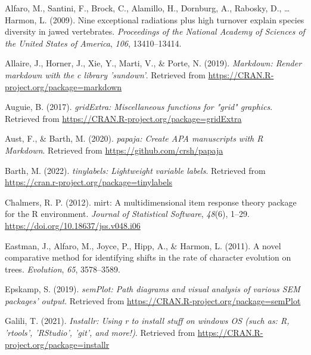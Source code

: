 \documentclass[
  english,
  man]{apa6}
\newlength{\cslhangindent}
\newlength{\cslentryspacingunit} %
\newenvironment{CSLReferences}[2] %
 {%
  \setlength{\parindent}{0pt}
  \ifodd #1
  \let\oldpar\par
  \def\par{\hangindent=\cslhangindent\oldpar}
  \fi
  \setlength{\parskip}{#2\cslentryspacingunit}
 }%
 {}
\begin{document}
\hypertarget{refs}{}
\begin{CSLReferences}{1}{0}
\leavevmode{}%
Alfaro, M., Santini, F., Brock, C., Alamillo, H., Dornburg, A., Rabosky, D., \ldots{} Harmon, L. (2009). Nine exceptional radiations plus high turnover explain species diversity in jawed vertebrates. \emph{Proceedings of the National Academy of Sciences of the United States of America}, \emph{106}, 13410--13414.

\leavevmode{}%
Allaire, J., Horner, J., Xie, Y., Marti, V., \& Porte, N. (2019). \emph{Markdown: Render markdown with the c library 'sundown'}. Retrieved from \url{https://CRAN.R-project.org/package=markdown}

\leavevmode{}%
Auguie, B. (2017). \emph{gridExtra: Miscellaneous functions for "grid" graphics}. Retrieved from \url{https://CRAN.R-project.org/package=gridExtra}

\leavevmode{}%
Aust, F., \& Barth, M. (2020). \emph{{papaja}: {Create} {APA} manuscripts with {R Markdown}}. Retrieved from \url{https://github.com/crsh/papaja}

\leavevmode{}%
Barth, M. (2022). \emph{{tinylabels}: Lightweight variable labels}. Retrieved from \url{https://cran.r-project.org/package=tinylabels}

\leavevmode{}%
Chalmers, R. P. (2012). {mirt}: A multidimensional item response theory package for the {R} environment. \emph{Journal of Statistical Software}, \emph{48}(6), 1--29. \url{https://doi.org/10.18637/jss.v048.i06}

\leavevmode{}%
Eastman, J., Alfaro, M., Joyce, P., Hipp, A., \& Harmon, L. (2011). A novel comparative method for identifying shifts in the rate of character evolution on trees. \emph{Evolution}, \emph{65}, 3578--3589.

\leavevmode{}%
Epskamp, S. (2019). \emph{semPlot: Path diagrams and visual analysis of various SEM packages' output}. Retrieved from \url{https://CRAN.R-project.org/package=semPlot}

\leavevmode{}%
Galili, T. (2021). \emph{Installr: Using r to install stuff on windows OS (such as: R, 'rtools', 'RStudio', 'git', and more!)}. Retrieved from \url{https://CRAN.R-project.org/package=installr}


\end{CSLReferences}
\end{document}
